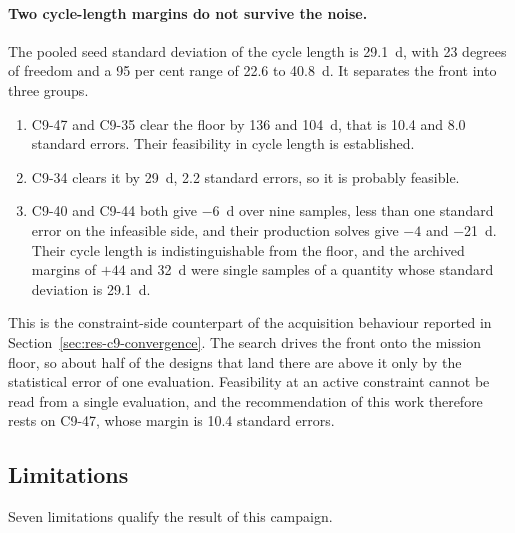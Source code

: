 \paragraph{Two cycle-length margins do not survive the noise.}
The pooled seed standard deviation of the cycle length is \SI{29.1}{d},
with 23 degrees of freedom and a 95 per cent range of 22.6 to
\SI{40.8}{d}. It separates the front into three groups.

\begin{enumerate}
  \item C9-47 and C9-35 clear the floor by 136 and \SI{104}{d}, that is
        10.4 and 8.0 standard errors. Their feasibility in cycle length
        is established.

  \item C9-34 clears it by \SI{29}{d}, 2.2 standard errors, so it is
        probably feasible.

  \item C9-40 and C9-44 both give \SI{-6}{d} over nine samples, less than
        one standard error on the infeasible side, and their production
        solves give $-4$ and \SI{-21}{d}. Their cycle length is
        indistinguishable from the floor, and the archived margins of
        $+44$ and \SI{+32}{d} were single samples of a quantity whose
        standard deviation is \SI{29.1}{d}.
\end{enumerate}

This is the constraint-side counterpart of the acquisition behaviour
reported in Section~\ref{sec:res-c9-convergence}. The search drives the
front onto the mission floor, so about half of the designs that land
there are above it only by the statistical error of one evaluation.
Feasibility at an active constraint cannot be read from a single
evaluation, and the recommendation of this work therefore rests on
C9-47, whose margin is 10.4 standard errors.

\subsection{Limitations}
\label{sec:res-c9-limits}

Seven limitations qualify the result of this campaign.

